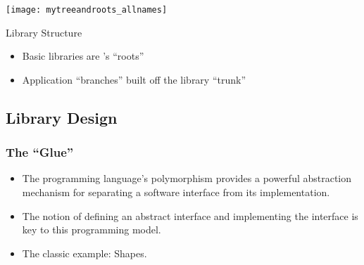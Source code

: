 \begin{frame}[t]


    \begin{minipage}[h]{.6\textwidth}
    \begin{center}
      \texttt{[image: mytreeandroots\_allnames]}
    \end{center}
  \end{minipage}
  \begin{minipage}[h]{.35\textwidth}
    \begin{block}{Library Structure}
      \begin{itemize}
    \item Basic libraries are \LibMesh's ``roots''
    \item Application ``branches'' built off the library ``trunk''
      \end{itemize}
    \end{block}
  \end{minipage}
\end{frame}



\subsection{Library Design}
\frame
{
  \frametitle{The ``Glue''}
  \begin{itemize}
    \item The \cpp{} programming language's polymorphism provides a powerful abstraction mechanism for separating a software interface from its implementation.
    \item The notion of  defining an abstract interface and  implementing the interface is key to this programming model.
      \pause
    \item The classic \cpp{} example: Shapes.
  \end{itemize}
  
}






